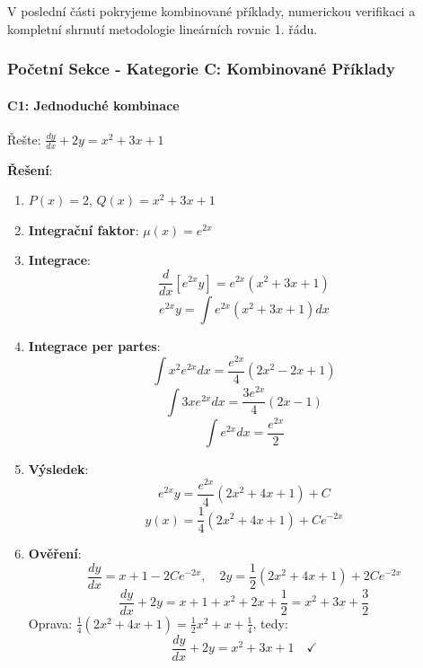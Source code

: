 \begin{transition}
V poslední části pokryjeme kombinované příklady, numerickou verifikaci a kompletní shrnutí metodologie lineárních rovnic 1. řádu.
\end{transition}


\subsubsection{Početní Sekce - Kategorie C: Kombinované Příklady}
\label{subsubsec:pocetni-kategorie-c}

\paragraph*{C1: Jednoduché kombinace}

\begin{example}
Řešte: $\frac{dy}{dx} + 2y = x^2 + 3x + 1$
\vspace{0.3\baselineskip}

\textbf{Řešení}: 
\begin{enumerate}
\item $P(x) = 2$, $Q(x) = x^2 + 3x + 1$

\item \textbf{Integrační faktor}: $\mu(x) = e^{2x}$

\item \textbf{Integrace}:
\[
\frac{d}{dx}[e^{2x}y] = e^{2x}(x^2 + 3x + 1)
\]
\[
e^{2x}y = \int e^{2x}(x^2 + 3x + 1)dx
\]

\item \textbf{Integrace per partes}:
\[
\int x^2 e^{2x}dx = \frac{e^{2x}}{4}(2x^2 - 2x + 1)
\]
\[
\int 3x e^{2x}dx = \frac{3e^{2x}}{4}(2x - 1)
\]
\[
\int e^{2x}dx = \frac{e^{2x}}{2}
\]

\item \textbf{Výsledek}:
\[
e^{2x}y = \frac{e^{2x}}{4}(2x^2 + 4x + 1) + C
\]
\[
y(x) = \frac{1}{4}(2x^2 + 4x + 1) + Ce^{-2x}
\]

\item \textbf{Ověření}:
\[
\frac{dy}{dx} = x + 1 - 2Ce^{-2x}, \quad 2y = \frac{1}{2}(2x^2 + 4x + 1) + 2Ce^{-2x}
\]
\[
\frac{dy}{dx} + 2y = x + 1 + x^2 + 2x + \frac{1}{2} = x^2 + 3x + \frac{3}{2}
\]
Oprava: $\frac{1}{4}(2x^2 + 4x + 1) = \frac{1}{2}x^2 + x + \frac{1}{4}$, tedy:
\[
\frac{dy}{dx} + 2y = x^2 + 3x + 1 \quad \checkmark
\]
\end{enumerate}
\end{example}

